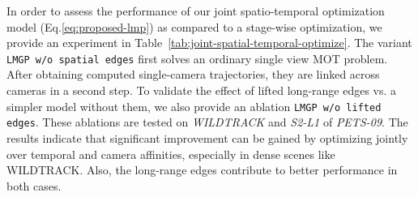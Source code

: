 In order to assess the performance of our joint spatio-temporal optimization model (Eq.\ref{eq:proposed-lmp}) as compared to a stage-wise optimization, we provide an experiment in  Table~\ref{tab:joint-spatial-temporal-optimize}.
The variant \texttt{LMGP w/o spatial edges} first solves an ordinary single view MOT problem. After obtaining computed single-camera trajectories, they are linked across cameras in a second step. To validate the effect of lifted long-range edges vs. a simpler model without them, we also provide an ablation \texttt{LMGP w/o lifted edges}. These ablations are tested on \textit{WILDTRACK} and \textit{S2-L1} of \textit{PETS-09}. The results 
indicate that significant improvement can be gained by optimizing jointly over temporal and camera affinities, especially in dense scenes like WILDTRACK. Also, the long-range edges contribute to better performance in both cases.
